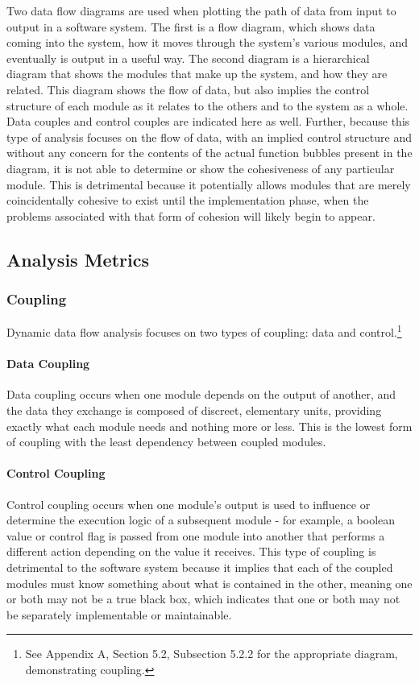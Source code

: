 \documentclass{article}
\begin{document}
		Two data flow diagrams are used when plotting the path of data from input to output in a software system. The first is a flow diagram, which shows data coming into the system, how it moves through the system's various modules, and eventually is output in a useful way. The second diagram is a hierarchical diagram that shows the modules that make up the system, and how they are related. This diagram shows the flow of data, but also implies the control structure of each module as it relates to the others and to the system as a whole. Data couples and control couples are indicated here as well. Further, because this type of analysis focuses on the flow of data, with an implied control structure and without any concern for the contents of the actual function bubbles present in the diagram, it is not able to determine or show the cohesiveness of any particular module. This is detrimental because it potentially allows modules that are merely coincidentally cohesive to exist until the implementation phase, when the problems associated with that form of cohesion will likely begin to appear. 
	\subsection{Analysis Metrics}
		\subsubsection{Coupling}
			Dynamic data flow analysis focuses on two types of coupling: data and control.\footnote{See Appendix A, Section 5.2, Subsection 5.2.2 for the appropriate diagram, demonstrating coupling.} 
			\paragraph{Data Coupling}
				Data coupling occurs when one module depends on the output of another, and the data they exchange is composed of discreet, elementary units, providing exactly what each module needs and nothing more or less. This is the lowest form of coupling with the least dependency between coupled modules. 
			\paragraph{Control Coupling}
				Control coupling occurs when one module's output is used to influence or determine the execution logic of a subsequent module - for example, a boolean value or control flag is passed from one module into another that performs a different action depending on the value it receives. This type of coupling is detrimental to the software system because it implies that each of the coupled modules must know something about what is contained in the other, meaning one or both may not be a true black box, which indicates that one or both may not be separately implementable or maintainable. 
\end{document}
